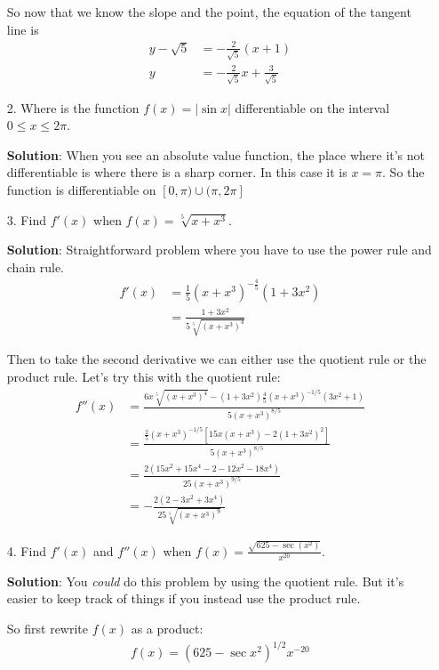 \documentclass[11pt,reqno]{article}
\theoremstyle{definition}
\begin{document}
\begin{enumerate}
		So now that we know the slope and the point, the equation of the tangent line is 
		\begin{align*}
			y - \sqrt{5} &= -\frac{2}{\sqrt{5}}(x + 1) \\
			y &= -\frac{2}{\sqrt{5}} x + \frac{3}{\sqrt{5}}
		\end{align*}
		
		\newpage
		\item[2.] Where is the function $f(x) =  |\sin x |$ differentiable on the interval $0 \leq x \leq 2 \pi$. 
		
		\textbf{Solution}: When you see an absolute value function, the place where it's not differentiable is where there is a sharp corner. In this case it is $x = \pi$. So the function is differentiable on $[0, \pi) \cup (\pi,2\pi]$
		\item[3.] Find $f'(x)$ when $f(x) = \sqrt[5]{x + x^3}$. 
		
		\textbf{Solution}: Straightforward problem where you have to use the power rule and chain rule. 
		\begin{align*}
			f'(x) &= \frac{1}{5} (x + x^3)^{-\frac{4}{5}} (1 + 3x^2) \\
			&= \frac{1 + 3x^2}{5 \sqrt[5]{(x + x^3)^4}}
		\end{align*}
		
		Then to take the second derivative we can either use the quotient rule or the product rule. Let's try this with the quotient rule:
		\begin{align*}
			f''(x) &= \frac{6x \sqrt[5]{(x + x^3 )^4} - (1 + 3 x^2)\frac{4}{5} (x + x^3 )^{-1/5} (3 x^2 + 1) }{5 (x + x^3)^{8/5}} \\
			&= \frac{\frac{2}{5} (x + x^3)^{-1/5} [15 x(x + x^3) - 2(1 + 3x^2 )^2]}{5 (x + x^3)^{8/5}} \\
			&= \frac{2 (15x^2 + 15x^4 - 2 - 12x^2 - 18x^4)}{25 (x + x^3)^{9/5}} \\
			&= -\frac{2(2 -3 x^2 +3 x^4 )}{25 \sqrt[5]{(x + x^{3})^9 }}
		\end{align*}
		\newpage
		
		\item[4.] Find $f'(x)$ and $f''(x)$ when $f(x) = \frac{\sqrt{625 - \sec (x^2)}}{ x^{20} }$.
		
		\textbf{Solution}: You \textit{could} do this problem by using the quotient rule. But it's easier to keep track of things if you instead use the product rule. 
		
		So first rewrite $f(x)$ as a product:
		\begin{align*}
			f(x) = (625 - \sec x^2)^{1/2} x^{-20}
		\end{align*}
		

\end{enumerate}
\end{document}
